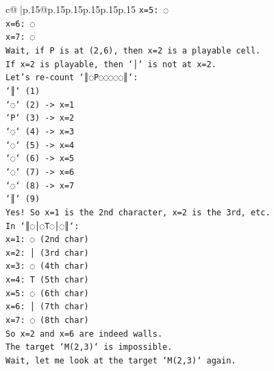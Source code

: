 \documentclass{article}
\begin{document}
{\begin{supertabular}{c@{$\;$}|p{.15\linewidth}@{}p{.15\linewidth}p{.15\linewidth}p{.15\linewidth}p{.15\linewidth}p{.15\linewidth}}
{{{\texttt{x=5: ◌} \\
\texttt{x=6: ◌} \\
\texttt{x=7: ◌} \\
\texttt{Wait, if P is at (2,6), then x=2 is a playable cell.} \\
\texttt{If x=2 is playable, then `│` is not at x=2.} \\
\texttt{Let's re{-}count `║◌P◌◌◌◌◌║`:} \\
\texttt{`║` (1)} \\
\texttt{`◌` (2) {-}> x=1} \\
\texttt{`P` (3) {-}> x=2} \\
\texttt{`◌` (4) {-}> x=3} \\
\texttt{`◌` (5) {-}> x=4} \\
\texttt{`◌` (6) {-}> x=5} \\
\texttt{`◌` (7) {-}> x=6} \\
\texttt{`◌` (8) {-}> x=7} \\
\texttt{`║` (9)} \\
\texttt{Yes! So x=1 is the 2nd character, x=2 is the 3rd, etc.} \\
\texttt{In `║◌│◌T◌│◌║`:} \\
\texttt{x=1: ◌ (2nd char)} \\
\texttt{x=2: │ (3rd char)} \\
\texttt{x=3: ◌ (4th char)} \\
\texttt{x=4: T (5th char)} \\
\texttt{x=5: ◌ (6th char)} \\
\texttt{x=6: │ (7th char)} \\
\texttt{x=7: ◌ (8th char)} \\
\texttt{So x=2 and x=6 are indeed walls.} \\
\texttt{The target `M(2,3)` is impossible.} \\
\texttt{Wait, let me look at the target `M(2,3)` again.} \\
            }
        }
    }
     \\ \\


\end{supertabular}}
\end{document}
